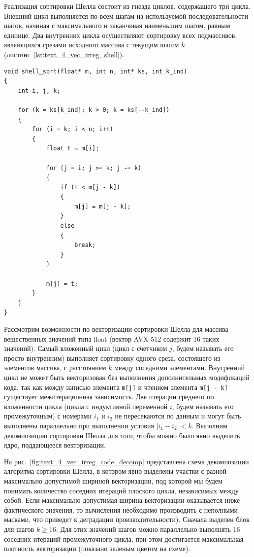 Реализация сортировки Шелла состоит из гнезда циклов, содержащего три цикла.
Внешний цикл выполняется по всем шагам из используемой последовательности шагов, начиная с максимального и заканчивая наименьшим шагом, равным единице.
Два внутренних цикла осуществляют сортировку всех подмассивов, являющихся срезами исходного массива с текущим шагом $k$ (листинг~\ref{lst:text_4_vec_irreg_shell}).

\begin{lstlisting}[caption={Реализация сортировки Шелла.},label={lst:text_4_vec_irreg_shell}]
void shell_sort(float* m, int n, int* ks, int k_ind)
{
    int i, j, k;

    for (k = ks[k_ind]; k > 0; k = ks[--k_ind])
    {
        for (i = k; i < n; i++)
        {
            float t = m[i];

            for (j = i; j >= k; j -= k)
            {
                if (t < m[j - k])
                {
                    m[j] = m[j - k];
                }
                else
                {
                    break;
                }
            }

            m[j] = t;
        }
    }
}
\end{lstlisting}

Рассмотрим возможности по векторизации сортировки Шелла для массива вещественных значений типа float (вектор AVX-512\label{abbr:avx-12} содержит 16 таких значений).
Самый вложенный цикл (цикл с счетчиком $j$, будем называть его просто внутренним) выполняет сортировку одного среза, состоящего из элементов массива, с расстоянием $k$ между соседними элементами.
Внутренний цикл не может быть векторизован без выполнения дополнительных модификаций кода, так как между записью элемента \texttt{m[j]} и чтением элемента \texttt{m[j - k]} существует межитерационная зависимость.
Две итерации среднего по вложенности цикла (цикла с индуктивной переменной $i$, будем называть его промежуточным) с номерами $i_1$ и $i_2$ не пересекаются по данным и могут быть выполнены параллельно при выполнении условия $|i_1 - i_2| < k$.
Выполним декомпозицию сортировки Шелла для того, чтобы можно было явно выделить ядро, поддающееся векторизации.

На рис.~\ref{fig:text_4_vec_irreg_code_decomp} представлена схема декомпозиции алгоритма сортировки Шелла, в котором явно выделены участки с разной максимально допустимой шириной векторизации, под которой мы будем понимать количество соседних итераций плоского цикла, независимых между собой.
Если максимально допустимая ширина векторизации оказывается ниже фактического значения, то вычисления необходимо производить с неполными масками, что приведет к деградации производительности).
Сначала выделен блок для шагов $k \ge 16$.
Для этих значений шагов можно параллельно выполнять 16 соседних итераций промежуточного цикла, при этом достигается максимальная плотность векторизации (показано зеленым цветом на схеме).


